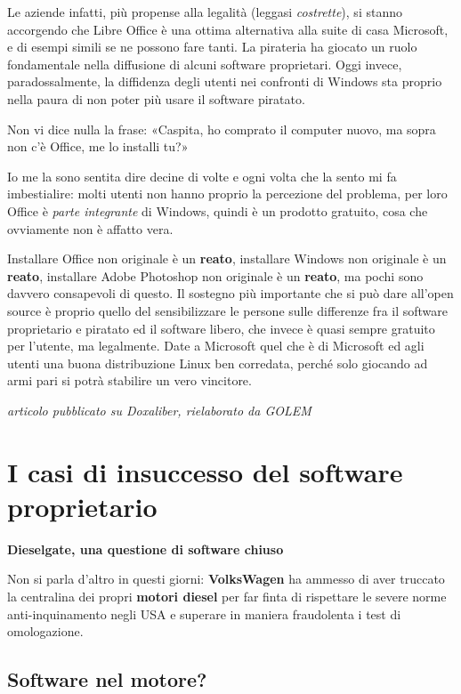 \documentclass[a4paper, 12pt]{extarticle}
\begin{document}
Le aziende infatti, più propense alla legalità (leggasi
\textit{costrette}), si stanno accorgendo che Libre Office è una ottima
alternativa alla suite di casa Microsoft, e di esempi simili se ne
possono fare tanti. La pirateria ha giocato un ruolo fondamentale nella
diffusione di alcuni software proprietari. Oggi invece,
paradossalmente, la diffidenza degli utenti nei confronti di Windows
sta proprio nella paura di non poter più usare il software piratato.

Non vi dice nulla la frase:
«Caspita, ho comprato il computer nuovo, ma sopra non c'è Office, me lo
installi tu?»

Io me la sono sentita dire decine di volte e ogni volta che la sento mi
fa imbestialire: molti utenti non hanno proprio la percezione del
problema, per loro Office è \textit{parte integrante} di Windows,
quindi è un prodotto gratuito, cosa che ovviamente non è affatto vera.

Installare Office non originale è un \textbf{reato}, installare Windows
non originale è un \textbf{reato}, installare Adobe Photoshop non
originale è un \textbf{reato}, ma pochi sono davvero consapevoli di
questo. Il sostegno più importante che si può dare all'open source è
proprio quello del sensibilizzare le persone sulle differenze fra il
software proprietario e piratato ed il software libero, che invece è
quasi sempre gratuito per l'utente, ma legalmente. Date a Microsoft
quel che è di Microsoft ed agli utenti una buona distribuzione Linux
ben corredata, perché solo giocando ad armi pari si potrà stabilire un
vero vincitore.

\begin{center}
\textit{articolo pubblicato su Doxaliber, rielaborato da GOLEM}
\end{center}

\clearpage

\section*{I casi di insuccesso del software proprietario}

\textbf{Dieselgate, una questione di software chiuso}

Non si parla d'altro in questi giorni: \textbf{VolksWagen} ha ammesso
di aver truccato la centralina dei propri \textbf{motori diesel} per
far finta di rispettare le severe norme anti-inquinamento negli USA e
superare in maniera fraudolenta i test di omologazione.

\subsection*{Software nel motore?}
\end{document}
